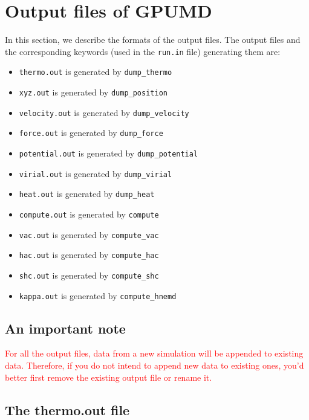 \documentclass[12pt,a4paper]{report}
\begin{document}
\section{Output files of GPUMD}

In this section, we describe the formats of the output files. The output files and the corresponding keywords (used in the \verb"run.in" file) generating them are:
\begin{itemize}
\item \verb"thermo.out" is generated by \verb"dump_thermo"
\item \verb"xyz.out" is generated by \verb"dump_position"
\item \verb"velocity.out" is generated by \verb"dump_velocity"
\item \verb"force.out" is generated by \verb"dump_force"
\item \verb"potential.out" is generated by \verb"dump_potential"
\item \verb"virial.out" is generated by \verb"dump_virial"
\item \verb"heat.out" is generated by \verb"dump_heat"
\item \verb"compute.out" is generated by \verb"compute"
\item \verb"vac.out" is generated by \verb"compute_vac"
\item \verb"hac.out" is generated by \verb"compute_hac"
\item \verb"shc.out" is generated by \verb"compute_shc"
\item \verb"kappa.out" is generated by \verb"compute_hnemd"
\end{itemize}


\subsection{An important note}

\textcolor{red}{For all the output files, data from a new simulation will be appended to existing data. Therefore, if you do not intend to append new data to existing ones, you'd better first remove the existing output file or rename it.}

\subsection{The thermo.out file}
\end{document}
